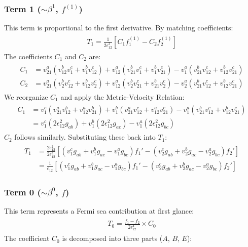 \documentclass[twocolumn, prx, reprint, amsfonts, amsmath, amssymb, longbibliography, floatfix, aps]{revtex4-2}
\begin{document}
\subsubsection*{Term 1 (\texorpdfstring{$\sim \beta^1$}{beta1}, \texorpdfstring{$f^{(1)}$}{f1})}
This term is proportional to the first derivative. By matching coefficients:
\begin{align}
\begin{aligned}
T_1 = \frac{1}{2\epsilon_{12}^3} \left[ C_1 f_1^{(1)} - C_2 f_2^{(1)} \right]
\end{aligned}
\end{align}
The coefficients $C_1$ and $C_2$ are:
\begin{align}
\begin{aligned}
C_1 &= v_{21}^a(v_{12}^b v_1^c + v_1^b v_{12}^c) + v_{12}^a(v_{21}^b v_1^c + v_1^b v_{21}^c) - v_1^a(v_{21}^b v_{12}^c + v_{12}^b v_{21}^c) \\
C_2 &= v_{21}^a(v_2^b v_{12}^c + v_{12}^b v_2^c) + v_{12}^a(v_2^b v_{21}^c + v_{21}^b v_2^c) - v_2^a(v_{21}^b v_{12}^c + v_{12}^b v_{21}^c)
\end{aligned}
\end{align}
We reorganize $C_1$ and apply the Metric-Velocity Relation:
\begin{align}
\begin{aligned}
C_1 &= v_1^c(v_{21}^a v_{12}^b + v_{12}^a v_{21}^b) + v_1^b(v_{21}^a v_{12}^c + v_{12}^a v_{21}^c) - v_1^a(v_{21}^b v_{12}^c + v_{12}^b v_{21}^c) \\
&= v_1^c(2\epsilon_{12}^2 g_{ab}) + v_1^b(2\epsilon_{12}^2 g_{ac}) - v_1^a(2\epsilon_{12}^2 g_{bc})
\end{aligned}
\end{align}
$C_2$ follows similarly. Substituting these back into $T_1$:
\begin{align}
\begin{aligned}
T_1 &= \frac{2\epsilon_{12}^2}{2\epsilon_{12}^3} \left[ (v_1^c g_{ab} + v_1^b g_{ac} - v_1^a g_{bc}) f_1' - (v_2^c g_{ab} + v_2^b g_{ac} - v_2^a g_{bc}) f_2' \right] \\
&= \frac{1}{\epsilon_{12}} \left[ (v_1^c g_{ab} + v_1^b g_{ac} - v_1^a g_{bc}) f_1' - (v_2^c g_{ab} + v_2^b g_{ac} - v_2^a g_{bc}) f_2' \right]
\label{Term1-0}
\end{aligned}
\end{align}


\subsubsection*{Term 0 (\texorpdfstring{$\sim \beta^0$}{beta0}, \texorpdfstring{$f$}{f0})}
This term represents a Fermi sea contribution at first glance:
\begin{align}
\begin{aligned}
T_0 = \frac{f_1 - f_2}{2\epsilon_{12}^4} \times C_0
\label{Term0}
\end{aligned}
\end{align}
The coefficient $C_0$ is decomposed into three parts ($A$, $B$, $E$):
\end{document}
